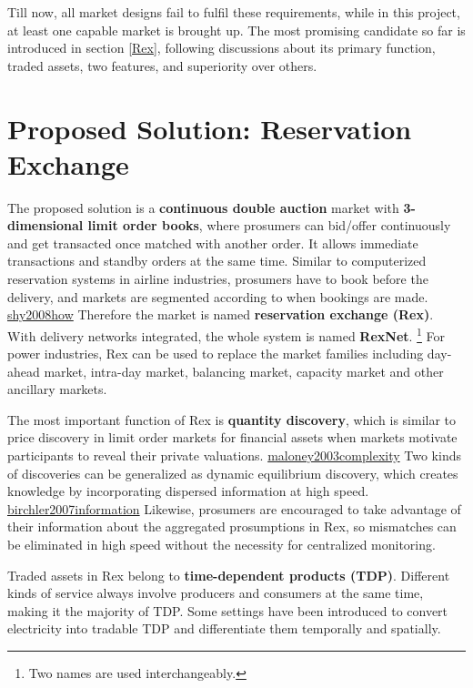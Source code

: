 \documentclass[letterpaper,8pt,twocolumn,twoside,]{pinp}
\begin{document}
Till now, all market designs fail to fulfil these requirements, while in
this project, at least one capable market is brought up. The most
promising candidate so far is introduced in section \ref{Rex}, following
discussions about its primary function, traded assets, two features, and
superiority over others.

\hypertarget{proposed-solution-reservation-exchange}{%
\section{Proposed Solution: Reservation
Exchange}\label{proposed-solution-reservation-exchange}}

\label{Rex}

The proposed solution is a \textbf{continuous double auction} market
with \textbf{3-dimensional limit order books}, where prosumers can
bid/offer continuously and get transacted once matched with another
order. It allows immediate transactions and standby orders at the same
time. Similar to computerized reservation systems in airline industries,
prosumers have to book before the delivery, and markets are segmented
according to when bookings are made.
\protect\hyperlink{reference}{shy2008how} Therefore the market is named
\textbf{reservation exchange (Rex)}. With delivery networks integrated,
the whole system is named \textbf{RexNet}.
\footnote{Two names are used interchangeably.} For power industries, Rex
can be used to replace the market families including day-ahead market,
intra-day market, balancing market, capacity market and other ancillary
markets.

The most important function of Rex is \textbf{quantity discovery}, which
is similar to price discovery in limit order markets for financial
assets when markets motivate participants to reveal their private
valuations. \protect\hyperlink{reference}{maloney2003complexity} Two
kinds of discoveries can be generalized as dynamic equilibrium
discovery, which creates knowledge by incorporating dispersed
information at high speed.
\protect\hyperlink{reference}{birchler2007information} Likewise,
prosumers are encouraged to take advantage of their information about
the aggregated prosumptions in Rex, so mismatches can be eliminated in
high speed without the necessity for centralized monitoring.

Traded assets in Rex belong to \textbf{time-dependent products (TDP)}.
Different kinds of service always involve producers and consumers at the
same time, making it the majority of TDP. Some settings have been
introduced to convert electricity into tradable TDP and differentiate
them temporally and spatially.
\end{document}
